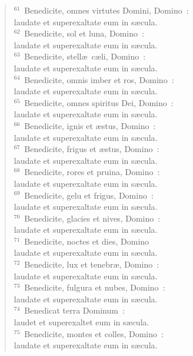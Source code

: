 \begin{flushleft}
\begin{verse}
${}^{61}$~Benedicite, omnes virtutes Domini, Domino~:\\ laudate et superexaltate eum in s\ae cula.\\
${}^{62}$~Benedicite, sol et luna, Domino~:\\ laudate et superexaltate eum in s\ae cula.\\
${}^{63}$~Benedicite, stell\ae\ c\ae li, Domino~:\\ laudate et superexaltate eum in s\ae cula.\\
${}^{64}$~Benedicite, omnis imber et ros, Domino~:\\ laudate et superexaltate eum in s\ae cula.\\
${}^{65}$~Benedicite, omnes spiritus Dei, Domino~:\\ laudate et superexaltate eum in s\ae cula.\\
${}^{66}$~Benedicite, ignis et \ae stus, Domino~:\\ laudate et superexaltate eum in s\ae cula.\\
${}^{67}$~Benedicite, frigus et \ae stus, Domino~:\\ laudate et superexaltate eum in s\ae cula.\\
${}^{68}$~Benedicite, rores et pruina, Domino~:\\ laudate et superexaltate eum in s\ae cula.\\
${}^{69}$~Benedicite, gelu et frigus, Domino~:\\ laudate et superexaltate eum in s\ae cula.\\
${}^{70}$~Benedicite, glacies et nives, Domino~:\\ laudate et superexaltate eum in s\ae cula.\\
${}^{71}$~Benedicite, noctes et dies, Domino\\ laudate et superexaltate eum in s\ae cula.\\
${}^{72}$~Benedicite, lux et tenebr\ae , Domino~:\\ laudate et superexaltate eum in s\ae cula.\\
${}^{73}$~Benedicite, fulgura et nubes, Domino~:\\ laudate et superexaltate eum in s\ae cula.\\
${}^{74}$~Benedicat terra Dominum~:\\ laudet et superexaltet eum in s\ae cula.\\
${}^{75}$~Benedicite, montes et colles, Domino~:\\ laudate et superexaltate eum in s\ae cula.\\

\end{verse}
\end{flushleft}
